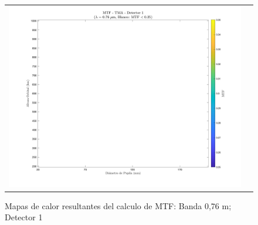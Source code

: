 \begin{landscape}
\begin{figure}[p]
\begin{tabular}{cc}
\includegraphics[width=0.48\linewidth]{4.Payload/MTF/MTF_Lambda3_Detector4_Telescopio4_heatmap.jpg} \\
\end{tabular}

\caption{Mapas de calor resultantes del calculo de MTF: Banda 0,76 \textmu m; Detector 1}
\end{figure}
\end{landscape}


